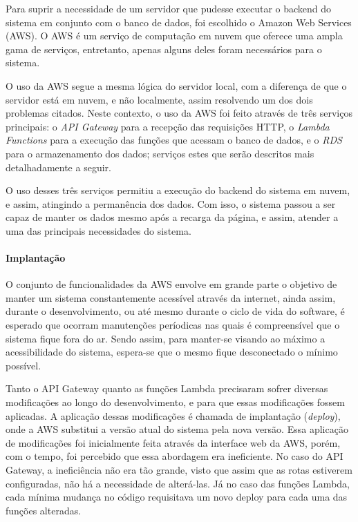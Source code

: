 Para suprir a necessidade de um servidor que pudesse executar o backend do sistema em conjunto com o banco de dados, foi escolhido o Amazon Web Services (AWS). O AWS é um serviço de computação em nuvem que oferece uma ampla gama de serviços, entretanto, apenas alguns deles foram necessários para o sistema.

O uso da AWS segue a mesma lógica do servidor local, com a diferença de que o servidor está em nuvem, e não localmente, assim resolvendo um dos dois problemas citados. Neste contexto, o uso da AWS foi feito através de três serviços principais: o \textit{API Gateway} para a recepção das requisições HTTP, o \textit{Lambda Functions} para a execução das funções que acessam o banco de dados, e o \textit{RDS} para o armazenamento dos dados; serviços estes que serão descritos mais detalhadamente a seguir.

O uso desses três serviços permitiu a execução do backend do sistema em nuvem, e assim, atingindo a permanência dos dados. Com isso, o sistema passou a ser capaz de manter os dados mesmo após a recarga da página, e assim, atender a uma das principais necessidades do sistema.


\paragraph*{Implantação}

O conjunto de funcionalidades da AWS envolve em grande parte o objetivo de manter um sistema constantemente acessível através da internet, ainda assim, durante o desenvolvimento, ou até mesmo durante o ciclo de vida do software, é esperado que ocorram manutenções períodicas nas quais é compreensível que o sistema fique fora do ar. Sendo assim, para manter-se visando ao máximo a acessibilidade do sistema, espera-se que o mesmo fique desconectado o mínimo possível.

Tanto o API Gateway quanto as funções Lambda precisaram sofrer diversas modificações ao longo do desenvolvimento, e para que essas modificações fossem aplicadas. A aplicação dessas modificações é chamada de implantação (\textit{deploy}), onde a AWS substitui a versão atual do sistema pela nova versão. Essa aplicação de modificações foi inicialmente feita através da interface web da AWS, porém, com o tempo, foi percebido que essa abordagem era ineficiente. No caso do API Gateway, a ineficiência não era tão grande, visto que assim que as rotas estiverem configuradas, não há a necessidade de alterá-las. Já no caso das funções Lambda, cada mínima mudança no código requisitava um novo deploy para cada uma das funções alteradas.


